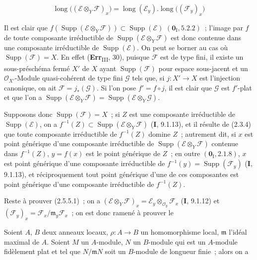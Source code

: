 \begin{env}[2.5.5.1]
\label{IV.2.5.5.1-fr}
\[
\operatorname{long}\bigl((\mathscr E\otimes_Y\mathscr F)_x\bigr)
=\operatorname{long}(\mathscr E_y).
 \operatorname{long}\bigl((\mathscr F_y)_x\bigr)
\]
\end{env}

Il est clair que
$f(\operatorname{Supp}(\mathscr E\otimes_Y\mathscr F))
\subset\operatorname{Supp}(\mathscr E)$ $(\mathbf{0}_{\mathrm I},5.2.2)$~; l'image
par $f$ de toute composante irréductible de
$\operatorname{Supp}(\mathscr E\otimes_Y\mathscr F)$ est donc contenue dans
une composante irréductible de $\operatorname{Supp}(\mathscr E)$. On peut se
borner au cas où $\operatorname{Supp}(\mathscr F)=X$. En effet
(\textbf{Err}\textsubscript{III}, 30), puisque $\mathscr F$ est de
type fini, il existe un sous-préschéma fermé $X'$ de $X$ ayant
$\operatorname{Supp}(\mathscr F)$ pour espace sous-jacent et un
$\mathcal O_{X'}$-Module quasi-cohérent de type fini $\mathscr G$ tels que,
si $j:X'\to X$ est l'injection canonique, on ait
$\mathscr F=j_*(\mathscr G)$. Si l'on pose $f'=f\circ j$, il est clair que
$\mathscr G$ est $f'$-plat et que l'on a
$\operatorname{Supp}(\mathscr E\otimes_Y\mathscr F)
=\operatorname{Supp}(\mathscr E\otimes_Y\mathscr G)$.

Supposons donc $\operatorname{Supp}(\mathscr F)=X$~; si $Z$ est une
composante irréductible de $\operatorname{Supp}(\mathscr E)$, on a
$f^{-1}(Z)\subset\operatorname{Supp}(\mathscr E\otimes_Y\mathscr F)$
(\textbf{I}, 9.1.13),
et il résulte de (2.3.4) que toute composante irréductible de $f^{-1}(Z)$
domine $Z$~; autrement dit, si $x$ est point générique d'une composante
irréductible de $\operatorname{Supp}(\mathscr E\otimes_Y\mathscr F)$
contenue dans $f^{-1}(Z)$, $y=f(x)$ est le point générique de $Z$~; en outre
$(\mathbf{0}_{\mathrm I},2.1.8)$, $x$ est point générique d'une composante
irréductible de
$f^{-1}(y)=\operatorname{Supp}(\mathscr F_y)$ (\textbf{I}, 9.1.13), et
réciproquement tout point générique d'une de ces composantes est point
générique d'une composante irréductible de $f^{-1}(Z)$.

Reste à prouver (2.5.5.1)~; on a
$(\mathscr E\otimes_Y\mathscr F)_x
=\mathscr E_y\otimes_{\mathcal O_y}\mathscr F_x$
(\textbf{I}, 9.1.12)
et
$(\mathscr F_y)_x=\mathscr F_x/\mathfrak m_y\mathscr F_x$~; on est donc
ramené à prouver le

\begin{lemma}[2.5.5.2]
\label{IV.2.5.5.2-fr}
Soient $A$, $B$ deux anneaux locaux, $\rho:A\to B$ un homomorphisme local,
$\mathfrak m$ l'idéal maximal de $A$. Soient $M$ un $A$-module, $N$ un
$B$-module qui est un $A$-module fidèlement plat et tel que
$N/\mathfrak mN$ soit un $B$-module de longueur finie~; alors on a
\end{lemma}

